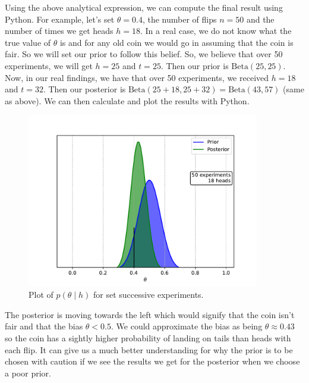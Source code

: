 \documentclass[11pt]{article}   %
\begin{document}
Using the above analytical expression, we can compute the final result using Python. For example, let's set $\theta = 0.4$, the number of flips $n = 50$ and the number of times we get heads $h = 18$. In a real case, we do not know what the true value of $\theta$ is and for any old coin we would go in assuming that the coin is fair. So we will set our prior to follow this belief. So, we believe that over 50 experiments, we will get $h=25$ and $t=25$. Then our prior is $\text{Beta}(25,25)$. Now, in our real findings, we have that over 50 experiments, we received $h=18$ and $t=32$. Then our posterior is $\text{Beta}(25+18,25+32) = \text{Beta}(43,57)$ (same as above). We can then calculate and plot the results with Python.
\begin{figure}[h]
\centering
\includegraphics[width = 4in]{Final.pdf}
\caption{Plot of $p(\theta\mid h)$ for set successive experiments.}
\label{figCoinFlipGood}
\end{figure}

The posterior is moving towards the left which would signify that the coin isn't fair and that the bias $\theta < 0.5$. We could approximate the bias as being $\theta \approx 0.43$ so the coin has a sightly higher probability of landing on tails than heads with each flip. It can give us a much better understanding for why the prior is to be chosen with caution if we see the results we get for the posterior when we choose a poor prior.
\end{document}
